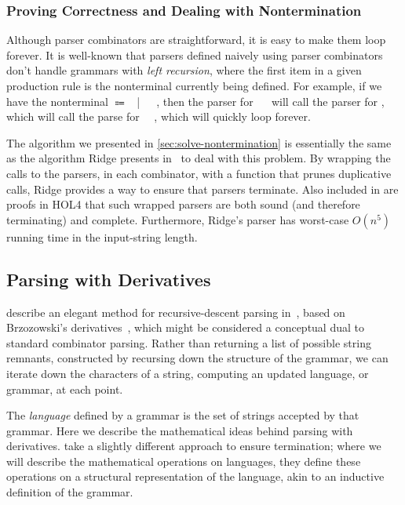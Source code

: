     \subsubsection{Proving Correctness and Dealing with Nontermination}
      Although parser combinators are straightforward, it is easy to make them loop forever.  It is well-known that parsers defined naively using parser combinators don't handle grammars with \emph{left recursion}, where the first item in a given production rule is the nonterminal currently being defined.  For example, if we have the nonterminal  $\Coloneqq$ ~|~~\terminal{+}~, then the parser for ~\terminal{+}~ will call the parser for , which will call the parse for ~\terminal{+}~, which will quickly loop forever.
      
      The algorithm we presented in \autoref{sec:solve-nontermination} is essentially the same as the algorithm Ridge presents in~\cite{Ridge} to deal with this problem.  By wrapping the calls to the parsers, in each combinator, with a function that prunes duplicative calls, Ridge provides a way to ensure that parsers terminate.  Also included in \cite{Ridge} are proofs in HOL4 that such wrapped parsers are both sound (and therefore terminating) and complete.  Furthermore, Ridge's parser has worst-case $O(n^5)$ running time in the input-string length.

  \subsection{Parsing with Derivatives}
     describe an elegant method for recursive-descent parsing in~\cite{Derivs}, based on Brzozowski's derivatives~\cite{BrzozowskiDerivs}, which might be considered a conceptual dual to standard combinator parsing.  Rather than returning a list of possible string remnants, constructed by recursing down the structure of the grammar, we can iterate down the characters of a string, computing an updated language, or grammar, at each point.
    
    The \emph{language} defined by a grammar is the set of strings accepted by that grammar.  Here we describe the mathematical ideas behind parsing with derivatives.  \citeauthor*{Derivs} take a slightly different approach to ensure termination; where we will describe the mathematical operations on languages, they define these operations on a structural representation of the language, akin to an inductive definition of the grammar.
    
